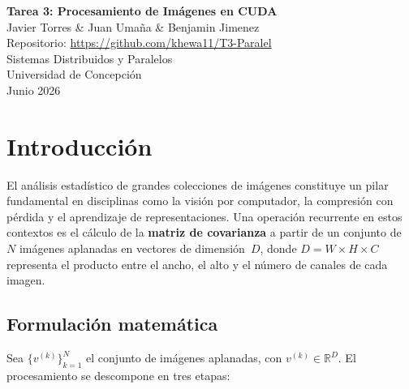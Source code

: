 \documentclass[12pt, a4paper]{article}
\begin{document}
\begin{center}
    {\LARGE \textbf{Tarea 3: Procesamiento de Imágenes en CUDA}} \\[0.5cm]
    {\large Javier Torres \& Juan Umaña \& Benjamin Jimenez} \\[0.2cm]
    {\small Repositorio: \url{https://github.com/khewa11/T3-Paralel}} \\[0.5cm]
    {\large Sistemas Distribuidos y Paralelos} \\
    {\large Universidad de Concepción} \\
    {\large Junio 2026} \\[1cm]
\end{center}

\section{Introducción}

El análisis estadístico de grandes colecciones de imágenes constituye un pilar
fundamental en disciplinas como la visión por computador, la compresión con
pérdida y el aprendizaje de representaciones. Una operación recurrente en estos
contextos es el cálculo de la \textbf{matriz de covarianza} a partir de un
conjunto de~$N$ imágenes aplanadas en vectores de dimensión~$D$, donde
$D = W \times H \times C$ representa el producto entre el ancho, el alto y el
número de canales de cada imagen.

\subsection{Formulación matemática}

Sea $\{v^{(k)}\}_{k=1}^{N}$ el conjunto de imágenes aplanadas, con
$v^{(k)} \in \mathbb{R}^{D}$. El procesamiento se descompone en tres etapas:
\end{document}
